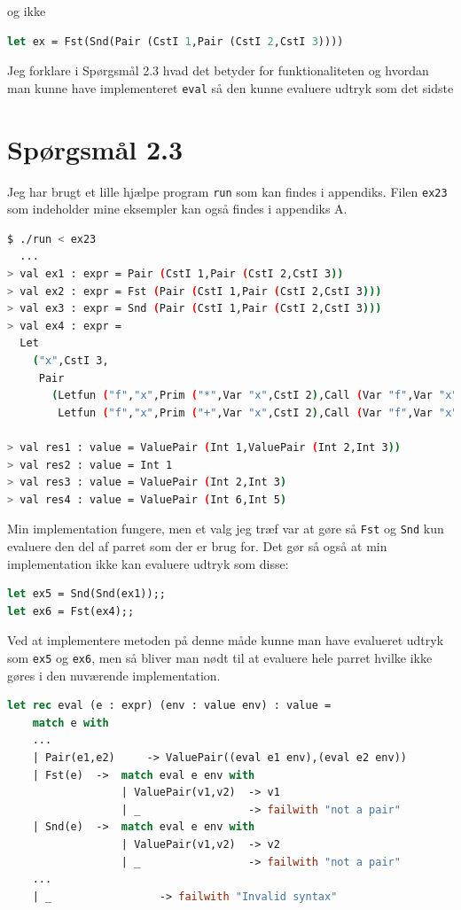 \documentclass[danish,a4paper]{report}
\begin{document}
og ikke

\begin{lstlisting}[language=ML]
let ex = Fst(Snd(Pair (CstI 1,Pair (CstI 2,CstI 3))))
\end{lstlisting}

Jeg forklare i Spørgsmål 2.3 hvad det betyder for funktionaliteten og hvordan man kunne have implementeret \texttt{eval} så den kunne evaluere udtryk som det sidste 

\section*{Spørgsmål 2.3}

Jeg har brugt et lille hjælpe program \texttt{run} som kan findes i appendiks. Filen \texttt{ex23} som indeholder mine eksempler kan også findes i appendiks A.

\begin{lstlisting}[language=bash]
$ ./run < ex23
  ...
> val ex1 : expr = Pair (CstI 1,Pair (CstI 2,CstI 3))
> val ex2 : expr = Fst (Pair (CstI 1,Pair (CstI 2,CstI 3)))
> val ex3 : expr = Snd (Pair (CstI 1,Pair (CstI 2,CstI 3)))
> val ex4 : expr =
  Let
    ("x",CstI 3,
     Pair
       (Letfun ("f","x",Prim ("*",Var "x",CstI 2),Call (Var "f",Var "x")),
        Letfun ("f","x",Prim ("+",Var "x",CstI 2),Call (Var "f",Var "x"))))

> val res1 : value = ValuePair (Int 1,ValuePair (Int 2,Int 3))
> val res2 : value = Int 1
> val res3 : value = ValuePair (Int 2,Int 3)
> val res4 : value = ValuePair (Int 6,Int 5)
\end{lstlisting}

Min implementation fungere, men et valg jeg træf var at gøre så \texttt{Fst} og \texttt{Snd} kun evaluere den del af parret som der er brug for. Det gør så også at min implementation ikke kan evaluere udtryk som disse:

\begin{lstlisting}[language=ML]
let ex5 = Snd(Snd(ex1));;
let ex6 = Fst(ex4);;
\end{lstlisting}

Ved at implementere metoden på denne måde kunne man have evalueret udtryk som \texttt{ex5} og \texttt{ex6}, men så bliver man nødt til at evaluere hele parret hvilke ikke gøres i den nuværende implementation.

\begin{lstlisting}[language=ML]
let rec eval (e : expr) (env : value env) : value =
    match e with
    ...
    | Pair(e1,e2)     -> ValuePair((eval e1 env),(eval e2 env)) 
    | Fst(e)  ->  match eval e env with
                  | ValuePair(v1,v2)  -> v1
                  | _                 -> failwith "not a pair"
    | Snd(e)  ->  match eval e env with
                  | ValuePair(v1,v2)  -> v2
                  | _                 -> failwith "not a pair" 
    ...
    | _                 -> failwith "Invalid syntax"
\end{lstlisting}
\end{document}
